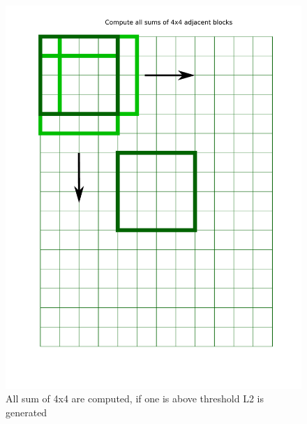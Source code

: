 \documentclass{article}
\begin{document}
\begin{figure}
	\centering
	\includegraphics[width=\textwidth]{figs/HCALSum.pdf}
	\caption{All sum of 4x4 are computed, if one is above threshold L2 is generated }
\end{figure}
\end{document}
